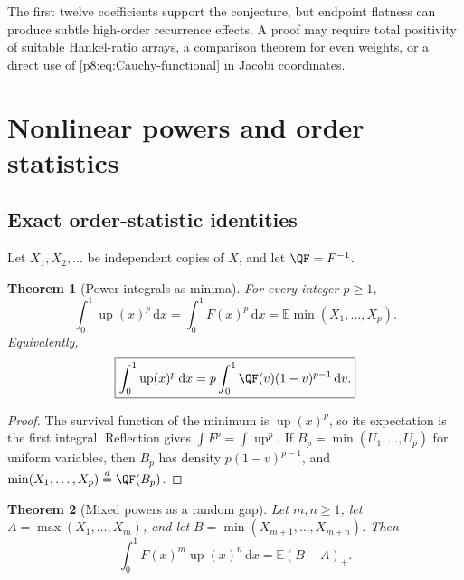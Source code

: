 \documentclass[11pt,oneside]{article}
\newtheorem{theorem}{Theorem}[section]
\theoremstyle{definition}
\theoremstyle{remark}
\newcommand{\Up}{\operatorname{up}}
\newcommand{\E}{\mathbb E}
\newcommand{\dd}{\,\mathrm d}
\newcommand{\1}{\mathbf 1}
\begin{document}
The first twelve coefficients support the conjecture, but endpoint flatness can
produce subtle high-order recurrence effects.  A proof may require total
positivity of suitable Hankel-ratio arrays, a comparison theorem for even
weights, or a direct use of \eqref{p8:eq:Cauchy-functional} in Jacobi coordinates.

\section{Nonlinear powers and order statistics}
\label{p8:sec:power-integrals}

\subsection{Exact order-statistic identities}

Let \(X_1,X_2,\ldots\) be independent copies of \(X\), and let
\(\QF=F^{-1}\).

\begin{theorem}[Power integrals as minima]
\label{p8:thm:power-minimum}
For every integer \(p\ge1\),
\begin{equation}
 \boxed{
 \int_0^1\Up(x)^p\dd x
 =\int_0^1F(x)^p\dd x
 =\E\min(X_1,\ldots,X_p).}
 \label{p8:eq:power-minimum}
\end{equation}
Equivalently,
\begin{equation}
 \boxed{
 \int_0^1\Up(x)^p\dd x
 =p\int_0^1\QF(v)(1-v)^{p-1}\dd v.}
 \label{p8:eq:power-beta-quantile}
\end{equation}
\statusprovedPartll
\end{theorem}

\begin{proof}
The survival function of the minimum is \(\Up(x)^p\), so its expectation is the
first integral.  Reflection gives \(\int F^p=\int\Up^p\).  If
\(B_p=\min(U_1,\ldots,U_p)\) for uniform variables, then
\(B_p\) has density \(p(1-v)^{p-1}\), and
\(\min(X_1,\ldots,X_p)\stackrel d=\QF(B_p)\).
\end{proof}

\begin{theorem}[Mixed powers as a random gap]
\label{p8:thm:mixed-powers-gap}
Let \(m,n\ge1\), let
\(A=\max(X_1,\ldots,X_m)\), and let
\(B=\min(X_{m+1},\ldots,X_{m+n})\).  Then
\begin{equation}
 \boxed{
 \int_0^1F(x)^m\Up(x)^n\dd x=\E(B-A)_+.}
 \label{p8:eq:mixed-gap}
\end{equation}
\statusprovedPartll
\end{theorem}
\end{document}
